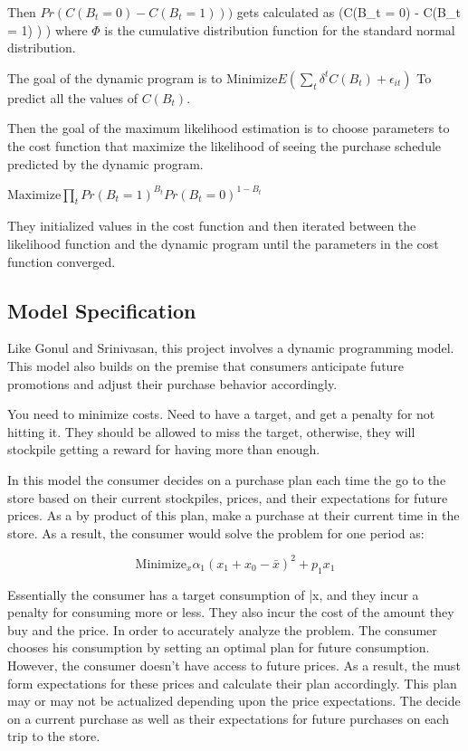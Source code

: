 \documentclass{article}
\begin{document}
Then $Pr(C(B_t = 0) - C(B_t = 1) ) )$ gets calculated as \Phi(C(B_t = 0) - C(B_t = 1) ) ) where $\Phi$ is the cumulative distribution function for the standard normal distribution.

The goal of the dynamic program is to 
$\text{Minimize} E( \sum_t \delta^{t} C(B_t) + \epsilon_{it} )$
To predict all the values of $C(B_t)$.

Then the goal of the maximum likelihood estimation is to choose parameters to the cost function that maximize the likelihood of seeing the purchase schedule predicted by the dynamic program. 

$\text{Maximize} \prod_{t} Pr({B_t= 1})^{B_t} Pr(B_t=0)^{1-B_t} $

They initialized values in the cost function and then iterated between the likelihood function and the dynamic program until the parameters in the cost function converged.

\subsection{Model Specification}

Like Gonul and Srinivasan, this project involves a dynamic programming model. This model also builds on the premise that consumers anticipate future promotions and adjust their purchase behavior accordingly.

You need to minimize costs. Need to have a target, and get a penalty for not hitting it. They should be allowed to miss the target, otherwise, they will stockpile getting a reward for having more than enough.


In this model the consumer decides on a purchase plan each time the go to the store based on their current stockpiles, prices, and their expectations for future prices. As a by product of this plan, make a purchase at their current time in the store. As a result, the consumer would solve the problem for one period as:

$$ \text{Minimize}_{x}  \alpha_1 (x_1 +x_0 - \bar{x})^2 + p_1 x_1 $$

Essentially the consumer has a target consumption of \bar{x}, and they incur a penalty for consuming more or less. They also incur the cost of the amount they buy and the price. In order to accurately analyze the problem. The consumer chooses his consumption by setting an optimal plan for future consumption. However, the consumer doesn't have access to future prices. As a result, the must form expectations for these prices and calculate their plan accordingly. This plan may or may not be actualized depending upon the price expectations. The decide on a current purchase as well as their expectations for future purchases on each trip to the store.
\end{document}
